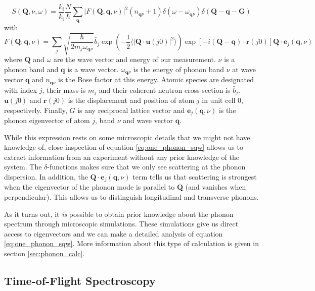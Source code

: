 \begin{equation}
	S(\bm{Q},\nu,\omega) = \frac{k_\text{f}}{k_\text{i}} \frac{N}{\hbar} \sum_{\bm{q}} | F(\bm{Q},\bm{q},\nu) |^2 ( n_{\bm{q}\nu} + 1) \delta (\omega - \omega_{\bm{q}\nu}) \delta(\bm{Q} - \bm{q} - \bm{G})
	\label{eq:one_phonon_sqw}
\end{equation}
%
with
%
\[
	F(\bm{Q}, \bm{q}, \nu) = \sum_j \sqrt{\frac{\hbar}{2 m_j \omega_{\bm{q}\nu}}} \bar{b}_j \exp \left( -\frac{1}{2} \langle | \bm{Q} \cdot \bm{u}(j0) |^2 \rangle \right) \exp [ -i(\bm{Q} - \bm{q}) \cdot \bm{r}(j0) ] \bm{Q} \cdot \bm{e}_j(\bm{q},\nu)
\]
%
where $\bm{Q}$ and $\omega$ are the wave vector and energy of our measurement. $\nu$ is a phonon band and $\bm{q}$ is a wave vector. $\omega_{\bm{q}\nu}$ is the energy of phonon band $\nu$ at wave vector $\bm{q}$ and $n_{\bm{q}\nu}$ is the Bose factor at this energy. Atomic species are designated with index $j$, their mass is $m_j$ and their coherent neutron cross-section is $\bar{b}_j$. $\bm{u}(j0)$ and $\bm{r}(j0)$ is the displacement and position of atom $j$ in unit cell 0, respectively. Finally, $G$ is any reciprocal lattice vector and $\bm{e}_j(\bm{q},\nu)$ is the phonon eigenvector of atom $j$, band $\nu$ and wave vector $\bm{q}$.

While this expression rests on some microscopic details that we might not have knowledge of, close inspection of equation \eqref{eq:one_phonon_sqw} allows us to extract information from an experiment without any prior knowledge of the system. The $\delta$-functions makes sure that we only see scattering at the phonon dispersion. In addition, the $\bm{Q}\cdot \bm{e}_j(\bm{q},\nu)$ term tells us that scattering is strongest when the eigenvector of the phonon mode is parallel to $\bm{Q}$ (and vanishes when perpendicular). This allows us to distinguish longitudinal and transverse phonons.

As it turns out, it \emph{is} possible to obtain prior knowledge about the phonon spectrum through microscopic simulations. These simulations give us direct access to eigenvectors and we can make a detailed analysis of equation \eqref{eq:one_phonon_sqw}. More information about this type of calculation is given in section \ref{sec:phonon_calc}.

\subsection{Time-of-Flight Spectroscopy}

